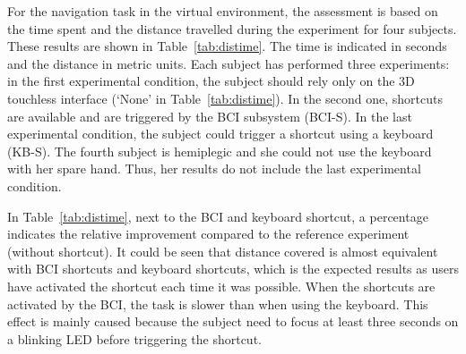 For the navigation task in the virtual environment, the assessment is based on the time spent and the distance travelled during the experiment for four subjects.
These results are shown in Table~\ref{tab:distime}. 
The time is indicated in seconds and the distance in metric units. 
Each subject has performed three experiments: in the first experimental condition, the subject should rely only on the 3D touchless interface (`None' in Table~\ref{tab:distime}).
In the second one, shortcuts are available and are triggered by the BCI subsystem (BCI-S).
In the last experimental condition, the subject could trigger a shortcut using a keyboard (KB-S).
The fourth subject is hemiplegic and she could not use the keyboard with her spare hand.
Thus, her results do not include the last experimental condition. 

In Table~\ref{tab:distime}, next to the BCI and keyboard shortcut, a percentage indicates the relative improvement compared to the reference experiment (without shortcut).
It could be seen that distance covered is almost equivalent with BCI shortcuts and keyboard shortcuts, which is the expected results as users have activated the shortcut each time it was possible. 
When the shortcuts are activated by the BCI, the task is slower than when using the keyboard. 
This effect is mainly caused because the subject need to focus at least three seconds on a blinking LED before triggering the shortcut. 



